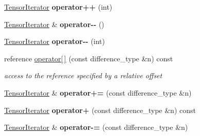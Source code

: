 \begin{DoxyCompactItemize}
\item 
\hypertarget{classbtas_1_1_tensor_iterator_ab8ffcabe6065cbe90d6e949e57895330}{
\hyperlink{classbtas_1_1_tensor_iterator}{TensorIterator} {\bfseries operator++} (int)}
\label{classbtas_1_1_tensor_iterator_ab8ffcabe6065cbe90d6e949e57895330}

\item 
\hypertarget{classbtas_1_1_tensor_iterator_a5884e777fa68eaf3c4cb04efc584c48f}{
\hyperlink{classbtas_1_1_tensor_iterator}{TensorIterator} \& {\bfseries operator-\/-\/} ()}
\label{classbtas_1_1_tensor_iterator_a5884e777fa68eaf3c4cb04efc584c48f}

\item 
\hypertarget{classbtas_1_1_tensor_iterator_a62bcf4a0a16c69507ab42612c389db1d}{
\hyperlink{classbtas_1_1_tensor_iterator}{TensorIterator} {\bfseries operator-\/-\/} (int)}
\label{classbtas_1_1_tensor_iterator_a62bcf4a0a16c69507ab42612c389db1d}

\item 
\hypertarget{classbtas_1_1_tensor_iterator_a4ec1ed9095f4abc3dbd0f824aa5113cb}{
reference \hyperlink{classbtas_1_1_tensor_iterator_a4ec1ed9095f4abc3dbd0f824aa5113cb}{operator\mbox{[}$\,$\mbox{]}} (const difference\_\-type \&n) const }
\label{classbtas_1_1_tensor_iterator_a4ec1ed9095f4abc3dbd0f824aa5113cb}

\begin{DoxyCompactList}\small\item\em access to the reference specified by a relative offset \item\end{DoxyCompactList}\item 
\hypertarget{classbtas_1_1_tensor_iterator_a3f9d3b1a900ee8ade010c3981d6c9d4b}{
\hyperlink{classbtas_1_1_tensor_iterator}{TensorIterator} \& {\bfseries operator+=} (const difference\_\-type \&n)}
\label{classbtas_1_1_tensor_iterator_a3f9d3b1a900ee8ade010c3981d6c9d4b}

\item 
\hypertarget{classbtas_1_1_tensor_iterator_a619ac8c06f84554641bf36e38d7db1a1}{
\hyperlink{classbtas_1_1_tensor_iterator}{TensorIterator} {\bfseries operator+} (const difference\_\-type \&n) const }
\label{classbtas_1_1_tensor_iterator_a619ac8c06f84554641bf36e38d7db1a1}

\item 
\hypertarget{classbtas_1_1_tensor_iterator_a3b4f06bcd58cfe27ea74d580b4bd0d97}{
\hyperlink{classbtas_1_1_tensor_iterator}{TensorIterator} \& {\bfseries operator-\/=} (const difference\_\-type \&n)}
\label{classbtas_1_1_tensor_iterator_a3b4f06bcd58cfe27ea74d580b4bd0d97}


\end{DoxyCompactItemize}
